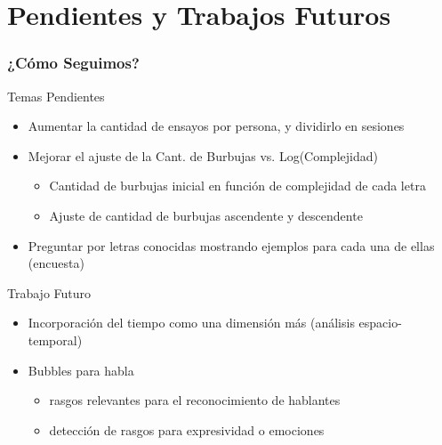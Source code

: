 \documentclass[10pt]{beamer}
\begin{document}
  \section{Pendientes y Trabajos Futuros}
	\begin{frame}
	\frametitle{¿C\'omo Seguimos?}
	  \begin{block}{Temas Pendientes}
	    \begin{itemize}
		\item Aumentar la cantidad de ensayos por persona, y dividirlo en sesiones
		\item Mejorar el ajuste de la Cant. de Burbujas vs. Log(Complejidad)
		\begin{itemize}
		      \item Cantidad de burbujas inicial en función de complejidad de cada letra
		      \item Ajuste de cantidad de burbujas ascendente y descendente
		\end{itemize}
		\item Preguntar por letras conocidas mostrando ejemplos para cada una de ellas (encuesta)
	    \end{itemize}
	  \end{block} \pause

	  \begin{block}{Trabajo Futuro}
	   \begin{itemize}
		\item Incorporación del tiempo como una dimensi\'on más (an\'alisis espacio-temporal)
		\item Bubbles para habla
		    \begin{itemize}
		      \item rasgos relevantes para el reconocimiento de hablantes
		      \item detección de rasgos para expresividad o emociones
		    \end{itemize}
	    \end{itemize}                     
	  \end{block}	    
	\end{frame}

\author[Christian, Miguel, Mail\'en]{Mail\'en G\'omez Mayol,\\Miguel Mart\'inez Soler,\\Christian Cossio Mercado}

\frame{\titlepage}

\appendix
\section{\appendixname}
\end{document}
